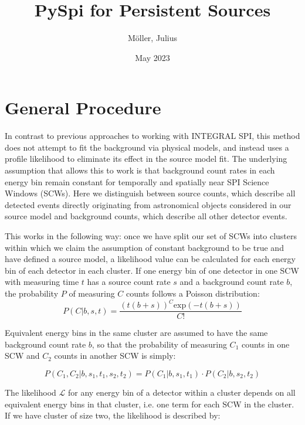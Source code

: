 \documentclass{article}
\title{PySpi for Persistent Sources}
\author{Möller, Julius}
\date{May 2023}
\begin{document}
\maketitle


\tableofcontents

\pagebreak


\section{General Procedure}
In contrast to previous approaches to working with INTEGRAL SPI, this method does not attempt to fit the background via physical models, and instead uses a profile likelihood to eliminate its effect in the source model fit. The underlying assumption that allows this to work is that background count rates in each energy bin remain constant for temporally and spatially near SPI Science Windows (SCWs). Here we distinguish between source counts, which describe all detected events directly originating from astronomical objects considered in our source model and background counts, which describe all other detector events.

This works in the following way: once we have split our set of SCWs into clusters within which we claim the assumption of constant background to be true and have defined a source model, a likelihood value can be calculated for each energy bin of each detector in each cluster. If one energy bin of one detector in one SCW with measuring time $t$ has a source count rate $s$ and a background count rate $b$, the probability $P$ of measuring $C$ counts follows a Poisson distribution:
\begin{equation}
    P(C \vert b, s, t) = \frac{\left( t \left( b + s \right) \right) ^C \text{exp}\left( -t \left( b+s\right)\right)}{C!}
\end{equation}

Equivalent energy bins in the same cluster are assumed to have the same background count rate $b$, so that the probability of measuring $C_1$ counts in one SCW and $C_2$ counts in another SCW is simply:

\begin{equation}
    P(C_1, C_2 \vert b, s_1, t_1, s_2, t_2) = P(C_1 \vert b, s_1, t_1) \cdot P(C_2 \vert b, s_2, t_2)
\end{equation}

The likelihood $\mathcal{L}$ for any energy bin of a detector within a cluster depends on all equivalent energy bins in that cluster, i.e. one term for each SCW in the cluster. If we have cluster of size two, the likelihood is described by:
\end{document}

